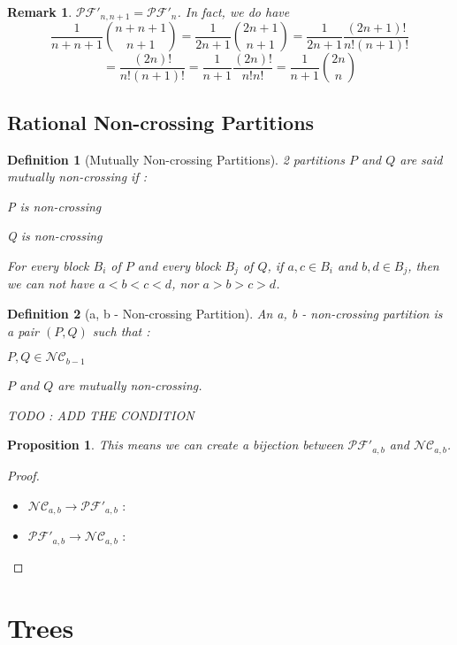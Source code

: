 \documentclass[12pt]{report}
\newtheorem*{prop}{Proposition}
\newtheorem{definition}{Definition}
\newtheorem*{rem}{Remark}
\begin{document}
\begin{rem}
    $\mathcal{PF'}_{n,n+1} = \mathcal{PF'}_n$.
    In fact, we do have
    $$\frac{1}{n + n + 1} \binom{n + n + 1}{n + 1}
    = \frac{1}{2n + 1} \binom {2n + 1}{n + 1}
    = \frac{1}{2n + 1} \frac{(2n + 1)!}{n ! (n+1)!}$$
    $$= \frac{(2n)!}{n!(n+1)!}
    = \frac{1}{n+1} \frac{(2n)!}{n!n!}
    = \frac{1}{n+1} \binom{2n}{n}$$
\end{rem}

\section{Rational Non-crossing Partitions}

\begin{definition}[Mutually Non-crossing Partitions]
    2 partitions $P$ and $Q$ are said
    \emph{mutually non-crossing} if :\\
    \begin{itemize*}
        \item P is non-crossing\\
        \item Q is non-crossing\\
        \item For every block $B_i$ of $P$ and every
        block $B_j$ of $Q$, if $a,c \in B_i$ and
        $b, d \in B_j$, then we can \emph{not} have
        $a < b < c < d$, nor $a > b > c > d$.
    \end{itemize*}    
\end{definition}

\begin{definition}[a, b - Non-crossing Partition]
    An \emph{a, b - non-crossing partition} is
    a pair $(P,Q)$ such that :\\
    \begin{itemize*}
        \item $P, Q \in \mathcal{NC}_{b-1}$\\
        \item $P$ and $Q$ are mutually non-crossing.\\
        \item TODO : ADD THE CONDITION
    \end{itemize*}
\end{definition}

\begin{prop}
    This means we can create a \emph{bijection} between
    $\mathcal{PF'}_{a,b}$ and $\mathcal{NC}_{a,b}$.
\end{prop}

\begin{proof}
    ~\\
\begin{itemize}
    \item $\mathcal{NC}_{a,b} \to \mathcal{PF'}_{a,b}$ :
    
    \item $\mathcal{PF'}_{a,b} \to \mathcal{NC}_{a,b}$ :
\end{itemize}
\end{proof}

\chapter{Trees}
\end{document}
